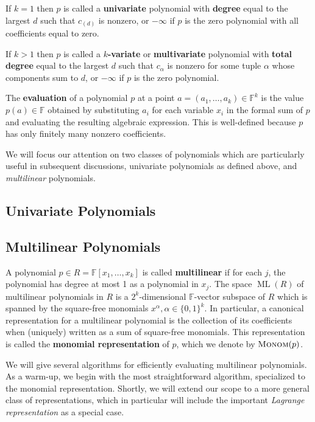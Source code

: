 \documentclass[12pt]{article}
\theoremstyle{plain}
\theoremstyle{definition}
\newcommand{\defn}[1]{\textbf{#1}}
\newcommand{\FF}{\mathbb{F}}                  %
\DeclareMathOperator{\ML}{ML}                 %
\newcommand*{\fn}[1]{\textsc{{#1}}}
\begin{document}
If $k = 1$ then $p$ is called a \defn{univariate} polynomial with \defn{degree} equal to the largest $d$ such that $c_{(d)}$ is nonzero, or $-\infty$ if $p$ is the zero polynomial with all coefficients equal to zero.

If $k > 1$ then $p$ is called a \defn{$k$-variate} or \defn{multivariate} polynomial with \defn{total degree} equal to the largest $d$ such that $c_{\alpha}$ is nonzero for some tuple $\alpha$ whose components sum to $d$, or $-\infty$ if $p$ is the zero polynomial.

The \defn{evaluation} of a polynomial $p$ at a point $a = (a_1, \ldots, a_k) \in \FF^k$ is the value $p(a) \in \FF$ obtained by substituting $a_i$ for each variable $x_i$ in the formal sum of $p$ and evaluating the resulting algebraic expression.  This is well-defined because $p$ has only finitely many nonzero coefficients.

We will focus our attention on two classes of polynomials which are particularly useful in subsequent discussions, univariate polynomials as defined above, and \emph{multilinear} polynomials.

\subsection{Univariate Polynomials}


\subsection{Multilinear Polynomials}

A polynomial $p \in R = \FF[x_1, \ldots, x_k]$ is called \defn{multilinear} if for each $j$, the polynomial has degree at most 1 as a polynomial in $x_j$.  The space $\ML(R)$ of multilinear polynomials in $R$ is a $2^k$-dimensional $\FF$-vector subspace of $R$ which is spanned by the square-free monomials $x^\alpha, \alpha \in \{0, 1\}^k$.  In particular, a canonical representation for a multilinear polynomial is the collection of its coefficients when (uniquely) written as a sum of square-free monomials.  This representation is called the \defn{monomial representation} of $p$, which we denote by $\fn{Monom}(p)$.

We will give several algorithms for efficiently evaluating multilinear polynomials.  As a warm-up, we begin with the most straightforward algorithm, specialized to the monomial representation.  Shortly, we will extend our scope to a more general class of representations, which in particular will include the important \emph{Lagrange representation} as a special case.
\end{document}
